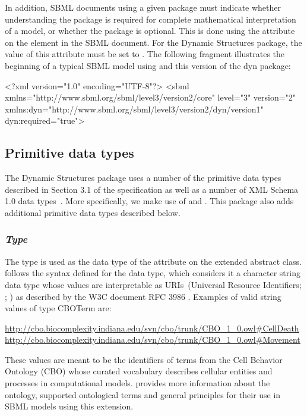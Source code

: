 \begin{center}
\end{center}

In addition, SBML documents using a given package must indicate whether
understanding the package is required for complete mathematical
interpretation of a model, or whether the package is optional.  This is
done using the attribute  on the  element in
the SBML document.  For the Dynamic Structures package, the value of
this attribute must be set to .
The following fragment illustrates the beginning of a typical SBML model
using \sbmlthreecore and this version of the dyn package:

\begin{example}
<?xml version="1.0" encoding="UTF-8"?>
<sbml xmlns="http://www.sbml.org/sbml/level3/version2/core" level="3" version="2"
     xmlns:dyn="http://www.sbml.org/sbml/level3/version2/dyn/version1" dyn:required="true">
\end{example}

\subsection{Primitive data types}
\label{subsec:primitives}
The Dynamic Structures package uses a number of the primitive data types described in Section 3.1 of the \sbmlthreecore specification as well as a number of XML Schema 1.0 data types~\citep{biron:2000}. More specifically, we make use of  and . This package also adds additional primitive data types described below.

\subsubsection{\emph{Type} }
\label{dat:CBOTerm}

The type  is used as the data type of the attribute  on the extended \SBase abstract class.  follows the syntax defined for the  data type, which considers it a character string data type whose values are interpretable as URIs~(Universal Resource Identifiers; \citep{Means:2001}; \citep{w3c:2000b}) as described by the W3C document RFC 3986 \citep{Berners-Lee:2005}. Examples of valid string values of type CBOTerm are:  
\begin{center}
\url{http://cbo.biocomplexity.indiana.edu/svn/cbo/trunk/CBO_1_0.owl#CellDeath} \url{http://cbo.biocomplexity.indiana.edu/svn/cbo/trunk/CBO_1_0.owl#Movement}
\end{center}
These values are meant to be the identifiers of terms from the Cell Behavior Ontology (CBO) whose curated vocabulary describes cellular entities and processes in computational models.  provides more information about the ontology, supported ontological terms and general principles for their use in SBML models using this extension.

